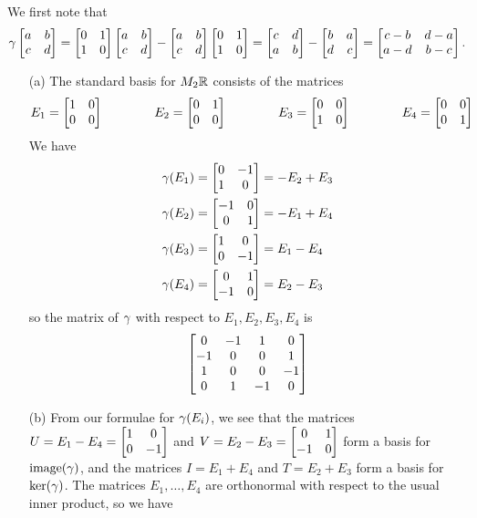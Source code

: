  We first note that
 \[ \gamma\left[\begin{matrix} a&b\\ c&d\end{matrix}\right] =
    \left[\begin{matrix} 0&1\\ 1&0\end{matrix}\right] \left[\begin{matrix} a&b\\ c&d\end{matrix}\right] -
    \left[\begin{matrix} a&b\\ c&d\end{matrix}\right] \left[\begin{matrix} 0&1\\ 1&0\end{matrix}\right] =
    \left[\begin{matrix} c&d\\ a&b\end{matrix}\right] - \left[\begin{matrix} b&a\\ d&c\end{matrix}\right] =
    \left[\begin{matrix} c-b & d-a \\ a-d & b-c \end{matrix}\right].
 \]
 \begin{itemize}
  \item[(a)] The standard basis for $M_2{\mathbb{R}}$ consists of the
   matrices
   \[ E_1 = \left[\begin{matrix} 1&0\\0&0 \end{matrix}\right] \hspace{4em}
      E_2 = \left[\begin{matrix} 0&1\\0&0 \end{matrix}\right] \hspace{4em}
      E_3 = \left[\begin{matrix} 0&0\\1&0 \end{matrix}\right] \hspace{4em}
      E_4 = \left[\begin{matrix} 0&0\\0&1 \end{matrix}\right]
   \]
   We have
   \begin{align*}
    \gamma(E_1) &= \left[\begin{matrix} 0&-1\\1&0 \end{matrix}\right] = -E_2+E_3 \\
    \gamma(E_2) &= \left[\begin{matrix} -1&0\\0&1 \end{matrix}\right] = -E_1+E_4 \\
    \gamma(E_3) &= \left[\begin{matrix} 1&0\\0&-1 \end{matrix}\right] =  E_1-E_4 \\
    \gamma(E_4) &= \left[\begin{matrix} 0&1\\-1&0 \end{matrix}\right] =  E_2-E_3
   \end{align*}
   so the matrix of $\gamma$ with respect to $E_1,E_2,E_3,E_4$ is
   \[ \left[\begin{matrix}  0 & -1 &  1 &  0 \\
           -1 &  0 &  0 &  1 \\
            1 &  0 &  0 & -1 \\
            0 &  1 & -1 &  0 \end{matrix}\right]
   \]
  \item[(b)] From our formulae for $\gamma(E_i)$, we see that the
   matrices $U=E_1-E_4=\left[\begin{matrix} 1&0\\0&-1\end{matrix}\right]$ and
   $V=E_2-E_3=\left[\begin{matrix} 0&1\\-1&0\end{matrix}\right]$ form a basis for $\operatorname{image}(\gamma)$, and
   the matrices $I=E_1+E_4$ and $T=E_2+E_3$ form a basis for
   $\ker(\gamma)$.  The matrices $E_1,\dotsc,E_4$ are orthonormal with
   respect to the usual inner product, so we have

\end{itemize}
